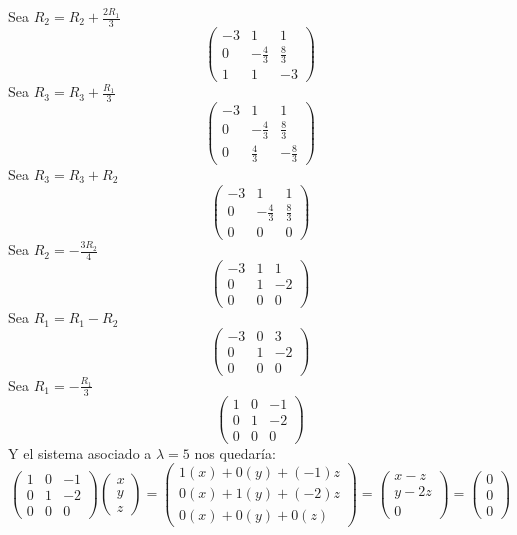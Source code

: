 \begin{itemize}
\begin{itemize}
    Sea $R_2=R_2+\frac{2R_1}{3}$
    $$\begin{pmatrix}-3&1&1\\ 0&-\frac{4}{3}&\frac{8}{3}\\ 1&1&-3\end{pmatrix}$$
    Sea $R_3=R_3+\frac{R_1}{3}$
    $$\begin{pmatrix}-3&1&1\\ 0&-\frac{4}{3}&\frac{8}{3}\\ 0&\frac{4}{3}&-\frac{8}{3}\end{pmatrix}$$
    Sea $R_3=R_3+R_2$
    $$\begin{pmatrix}-3&1&1\\ 0&-\frac{4}{3}&\frac{8}{3}\\ 0&0&0\end{pmatrix}$$
    Sea $R_2=-\frac{3R_2}{4}$
    $$\begin{pmatrix}-3&1&1\\ 0&1&-2\\ 0&0&0\end{pmatrix}$$
    Sea $R_1=R_1-R_2$
    $$\begin{pmatrix}-3&0&3\\ 0&1&-2\\ 0&0&0\end{pmatrix}$$
    Sea $R_1=-\frac{R_1}{3}$
    $$\begin{pmatrix}1&0&-1\\ 0&1&-2\\ 0&0&0\end{pmatrix}$$
    Y el sistema asociado a $\lambda=5$ nos quedar\'ia:
    $$\begin{pmatrix}1&0&-1\\ 0&1&-2\\ 0&0&0\end{pmatrix}\begin{pmatrix}x\\ y\\ z\end{pmatrix}=\begin{pmatrix}1(x)+0(y)+(-1)z\\ 0(x)+1(y)+(-2)z\\0(x)+0(y)+0(z)\end{pmatrix}=\begin{pmatrix}x-z\\ y-2z\\ 0\end{pmatrix}=\begin{pmatrix}0\\ 0\\ 0\end{pmatrix}$$

\end{itemize}
\end{itemize}
